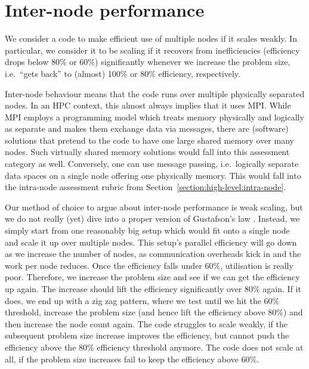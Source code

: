 \section{Inter-node performance}
\label{section:high-level:inter-node}

\begin{summary}
 We consider a code to make efficient use of multiple nodes if it scales weakly. 
 In particular, we consider it to be scaling if it recovers from inefficiencies (efficiency drops below 80\% or 60\%) significantly whenever we increase the problem size,
 i.e.~``gets back'' to (almost) 100\% or 80\% efficiency, respectively.
\end{summary}



Inter-node behaviour means that the code runs over multiple physically separated nodes. 
In an HPC context, this almost always implies that it uses MPI.
While MPI employs a programming model which treats memory physically and logically as separate and makes them exchange data via messages,
there are (software) solutions that pretend to the code to have one large shared memory over many nodes.
Such virtually shared memory solutions would fall into this assessment category as well.
Conversely, one can use message passing, i.e.~logically separate data spaces on a single node offering one physically memory.
This would fall into the intra-node assessment rubric from Section~\ref{section:high-level:intra-node}.


Our method of choice to argue about inter-node performance is weak scaling, but we do not really (yet) dive into a proper version of Gustafson's law \cite{gustafson1988}.
Instead, we simply start from one reasonably big setup which would fit onto a single node and scale it up over multiple nodes.
This setup's parallel efficiency will go down as we increase the number of nodes, as communication overheads kick in and the work per node reduces.
Once the efficiency falls under 60\%, utilisation is really poor.
Therefore, we increase the problem size and see if we can get the efficiency up again.
The increase should lift the efficiency significantly over 80\% again. 
If it does, we end up with a zig zag pattern, where we test until we hit the 60\% threshold, increase the problem size (and hence lift the efficiency above 80\%) and then increase the node count again.
The code struggles to scale weakly, if the subsequent problem size increase improves the efficiency, but cannot push the efficiency above the 80\% efficiency threshold anymore.
The code does not scale at all, if the problem size increases fail to keep the efficiency above 60\%.



